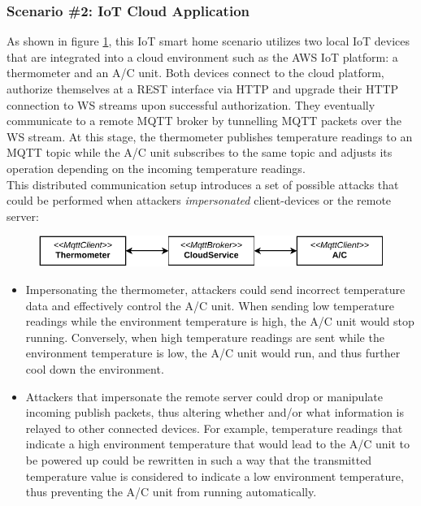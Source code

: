 \subsubsection{Scenario \#2: \ac{IoT} Cloud Application}
\label{par:scenario-2} As shown in figure \ref{fig:arch-smart-home}, this \ac{IoT} smart home scenario utilizes two local \ac{IoT} devices that are integrated into a cloud environment such as the \ac{AWS} \ac{IoT} platform: a thermometer and an \ac{A/C} unit. Both devices connect to the cloud platform, authorize themselves at a \ac{REST} interface via \ac{HTTP} and upgrade their \ac{HTTP} connection to \ac{WS} streams upon successful authorization. They eventually communicate to a remote \ac{MQTT} broker by tunnelling \ac{MQTT} packets over the \ac{WS} stream. At this stage, the thermometer publishes temperature readings to an \ac{MQTT} topic while the \ac{A/C} unit subscribes to the same topic and adjusts its operation depending on the incoming temperature readings. \\
This distributed communication setup introduces a set of possible attacks that could be performed when attackers \emph{impersonated} client-devices or the remote server:
\begin{figure}[h]
    \centering
    \includegraphics{img/ch04/Scenario_SmartHome.pdf}
    \label{fig:arch-smart-home}
\end{figure}
\begin{itemize}
    \item Impersonating the thermometer, attackers could send incorrect temperature data and effectively control the \ac{A/C} unit. When sending low temperature readings while the environment temperature is high, the \ac{A/C} unit would stop running. Conversely, when high temperature readings are sent while the environment temperature is low, the \ac{A/C} unit would run, and thus further cool down the environment.
    \item Attackers that impersonate the remote server could drop or manipulate incoming publish packets, thus altering whether and/or what information is relayed to other connected devices. For example, temperature readings that indicate a high environment temperature that would lead to the \ac{A/C} unit to be powered up could be rewritten in such a way that the transmitted temperature value is considered to indicate a low environment temperature, thus preventing the \ac{A/C} unit from running automatically.
\end{itemize}

